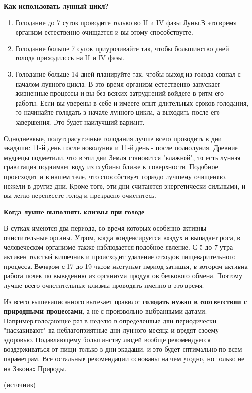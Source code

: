 \textbf{Как использовать лунный цикл?}
\begin{enumerate}
\item Голодание до 7 суток проводите только во II и IV фазы Луны.В это время организм естественно очищается и вы этому способствуете.

\item Голодание больше 7 суток приурочивайте так, чтобы большинство дней голода приходилось на II и IV фазы.
\item  Голодание больше 14 дней планируйте так, чтобы выход из голода совпал с началом лунного цикла. В это время организм естественно запускает жизненные процессы и вы без всяких затруднений войдете в ритм его работы. Если вы уверены в себе и имеете опыт длительных сроков голодания, то начинайте голодать в начале лунного цикла, а выходить после его завершения. Это будет наилучший вариант.
\end{enumerate}

Однодневные, полуторасуточные голодания лучше всего проводить в дни экадаши: 11-й день после новолуния и 11-й день - после полнолуния. Древние мудрецы подметили, что в эти дни Земля становится "влажной", то есть лунная гравитация поднимает воду из глубины ближе к поверхности. Подобное происходит и в нашем теле, что способствует гораздо лучшему очищению, нежели в другие дни. Кроме того, эти дни считаются энергетически сильными, и вы легко перенесете голод и прекрасно очиститесь.

\textbf{Когда лучше выполнять клизмы при голоде}

В сутках имеются два периода, во время которых особенно активны очистительные органы. Утром, когда конденсируется воздух и выпадает роса, в человеческом организме также наблюдается подобное явление. С 5 до 7 утра активен толстый кишечник и происходит удаление отходов пищеварительного процесса. Вечером с 17 до 19 часов наступает период затишья, в котором активна работа почек по выведению из организма продуктов белкового обмена. Поэтому лучше всего очистительные клизмы проводить именно в это время.

Из всего вышенаписанного вытекает правило: \textbf{голодать нужно в соответствии с природными процессами}, а не с произвольно выбранными датами. Например,голодающие раз в неделю в определенные дни периодически "наскакивают" на неблагоприятные дни лунного месяца и вредят своему здоровью.
Подавляющему большинству людей вообще рекомендуется воздерживаться от пищи только в дни экадаши, и это будет оптимально по всем параметрам. Все остальные рекомендации основаны на чем угодно, но только не на Законах Природы.

(\href{https://vk.com/away.php?to=http%3A%2F%2Fgovoritluna.ru%2Flechebnoe-golodanie%2Fuchet-lunnogo-tsikla-pri-provedenii-golodaniya&post=2453299_2575&cc_key=}{источник})

